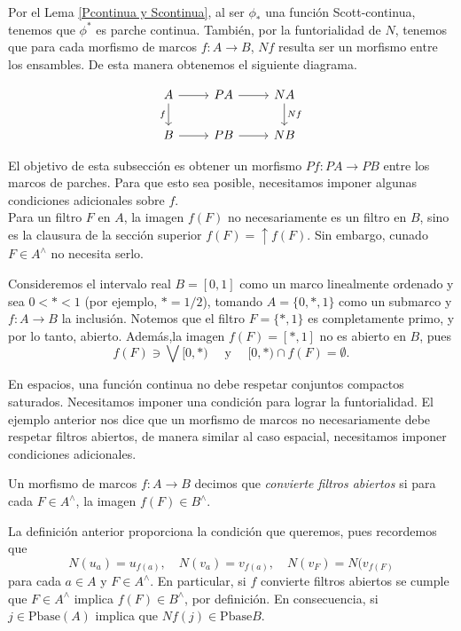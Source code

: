 Por el Lema \ref{Pcontinua y Scontinua}, al ser $\phi_*$ una función Scott-continua, tenemos que $\phi^*$ es parche continua. También, por la funtorialidad de $N$, tenemos que para cada morfismo de marcos $f\colon A\to B$, $Nf$ resulta ser un morfismo entre los ensambles. De esta manera obtenemos el siguiente diagrama.

\[\begin{tikzcd}
	A & PA & NA \\
	B & PB & NB
	\arrow[from=1-1, to=1-2]
	\arrow["f"', from=1-1, to=2-1]
	\arrow[from=1-2, to=1-3]
	\arrow["Nf", from=1-3, to=2-3]
	\arrow[from=2-1, to=2-2]
	\arrow[from=2-2, to=2-3]
\end{tikzcd}\]

El objetivo de esta subsección es obtener un morfismo $Pf\colon PA\to PB$ entre los marcos de parches. Para que esto sea posible, necesitamos imponer algunas condiciones adicionales sobre $f$.\\

Para un filtro $F$ en $A$, la imagen $f(F)$ no necesariamente es un filtro en $B$, sino es la clausura de la sección superior $f(F)=\uparrow f(F)$. Sin embargo, cunado $F\in A^\wedge$ no necesita serlo.

\begin{ej}\label{Ejemplo7.2.1}
    Consideremos el intervalo real $B=[0,1]$ como un marco linealmente ordenado y sea $0< * < 1$ (por ejemplo, $*=1/2$), tomando $A=\{0, *, 1\}$ como un submarco y $f\colon A\to B$ la inclusión. Notemos que el filtro $F=\{*, 1\}$ es completamente primo, y por lo tanto, abierto. Además,la imagen $f(F)=[*, 1]$ no es abierto en $B$, pues 
    \[
    f(F)\ni \bigvee [0, *)\quad \mbox{ y }\quad[0, *)\cap f(F)=\emptyset.
    \]
\end{ej}

En espacios, una función continua no debe respetar conjuntos compactos saturados. Necesitamos imponer una condición para lograr la funtorialidad. El ejemplo anterior nos dice que un morfismo de marcos no necesariamente debe respetar filtros abiertos, de manera similar al caso espacial, necesitamos imponer condiciones adicionales.\\

\begin{dfn}\label{Definicion7.2.2}
    Un morfismo de marcos $f\colon A\to B$ decimos que \emph{convierte filtros abiertos} si para cada $F\in A^\wedge$, la imagen $f(F)\in B^\wedge$.
\end{dfn}

La definición anterior proporciona la condición que queremos, pues recordemos que 
\[
N(u_a)=u_{f(a)},\quad N(v_a)=v_{f(a)},\quad N(v_F)=N(v_{f(F)}
\]
para cada $a\in A$ y $F\in A^\wedge$. En particular, si $f$ convierte filtros abiertos se cumple que $F\in A^\wedge$ implica $f(F)\in B^\wedge$, por definición. En consecuencia, si $j\in \mbox{Pbase}(A)$ implica que $Nf(j)\in \mbox{Pbase}B$.\\

